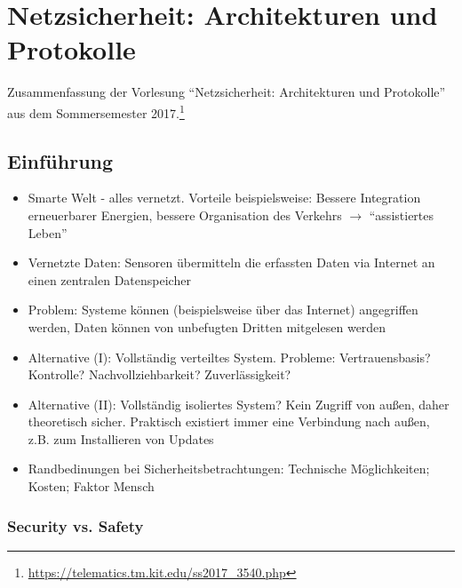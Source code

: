 \chapter{Netzsicherheit: Architekturen und Protokolle}

Zusammenfassung der Vorlesung "`Netzsicherheit: Architekturen und Protokolle"' aus dem Sommersemester 2017.\footnote{\url{https://telematics.tm.kit.edu/ss2017_3540.php}}

\section{Einführung}
\begin{itemize}
	\item Smarte Welt - alles vernetzt. Vorteile beispielsweise: Bessere Integration erneuerbarer Energien, bessere Organisation des Verkehrs \(\rightarrow\) "`assistiertes Leben"'
	\item Vernetzte Daten: Sensoren übermitteln die erfassten Daten via Internet an einen zentralen Datenspeicher
	\item Problem: Systeme können (beispielsweise über das Internet) angegriffen werden, Daten können von unbefugten Dritten mitgelesen werden
	\item Alternative (I): Vollständig verteiltes System. Probleme: Vertrauensbasis? Kontrolle? Nachvollziehbarkeit? Zuverlässigkeit?
	\item Alternative (II): Vollständig isoliertes System? Kein Zugriff von außen, daher theoretisch sicher. Praktisch existiert immer eine Verbindung nach außen, z.B. zum Installieren von Updates
	\item Randbedinungen bei Sicherheitsbetrachtungen: Technische Möglichkeiten; Kosten; Faktor Mensch
\end{itemize}


\subsection{Security vs. Safety}

